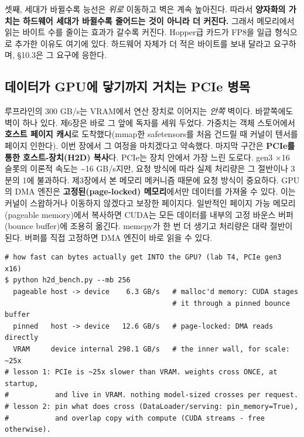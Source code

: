 셋째, 세대가 바뀔수록 능선은 \textit{위로} 이동하고 벽은 계속 높아진다. 따라서 \textbf{양자화의 가치는 하드웨어 세대가 바뀔수록 줄어드는 것이 아니라 더 커진다.} 그래서 메모리에서 읽는 바이트 수를 줄이는 효과가 갈수록 커진다. Hopper급 카드가 FP8을 일급 형식으로 추가한 이유도 여기에 있다. 하드웨어 자체가 더 적은 바이트를 보내 달라고 요구하며, §10.3은 그 요구에 응한다.

\subsection*{데이터가 GPU에 닿기까지 거치는 PCIe 병목}

루프라인의 300 GB/s는 VRAM에서 연산 장치로 이어지는 \textit{안쪽} 벽이다. 바깥쪽에도 벽이 하나 있다. 제6장은 바로 그 앞에 독자를 세워 두었다. 가중치는 객체 스토어에서 \textbf{호스트 페이지 캐시}로 도착했다(mmap한 safetensors를 처음 건드릴 때 커널이 텐서를 페이지 인한다). 이번 장에서 그 여정을 마치겠다고 약속했다. 마지막 구간은 \textbf{PCIe를 통한 호스트-장치(H2D) 복사}다. PCIe는 장치 안에서 가장 느린 도로다. gen3 ×16 슬롯의 이론적 속도는 \textasciitilde{}16 GB/s지만, 요청 방식에 따라 실제 처리량은 그 절반이나 3분의 1에 불과하다. 제3장에서 본 메모리 메커니즘 때문에 요청 방식이 중요하다. GPU의 DMA 엔진은 \textbf{고정된(page-locked) 메모리}에서만 데이터를 가져올 수 있다. 이는 커널이 스왑하거나 이동하지 않겠다고 보장한 페이지다. 일반적인 페이지 가능 메모리(pageable memory)에서 복사하면 CUDA는 모든 데이터를 내부의 고정 바운스 버퍼(bounce buffer)에 조용히 옮긴다. memcpy가 한 번 더 생기고 처리량은 대략 절반이 된다. 버퍼를 직접 고정하면 DMA 엔진이 바로 읽을 수 있다.

\begin{terminalbox}
\begin{Verbatim}[breaklines=true,breakanywhere=true,fontsize=\small,formatcom=\color{tbbtermfg},codes=\tbbcodeactive]
# how fast can bytes actually get INTO the GPU? (lab T4, PCIe gen3 x16)
$ python h2d_bench.py --mb 256
  pageable host -> device    6.3 GB/s   # malloc'd memory: CUDA stages
                                        # it through a pinned bounce buffer
  pinned   host -> device   12.6 GB/s   # page-locked: DMA reads directly
  VRAM     device internal 298.1 GB/s   # the inner wall, for scale: ~25x
# lesson 1: PCIe is ~25x slower than VRAM. weights cross ONCE, at startup,
#           and live in VRAM. nothing model-sized crosses per request.
# lesson 2: pin what does cross (DataLoader/serving: pin_memory=True),
#           and overlap copy with compute (CUDA streams - free otherwise).
\end{Verbatim}
\end{terminalbox}

